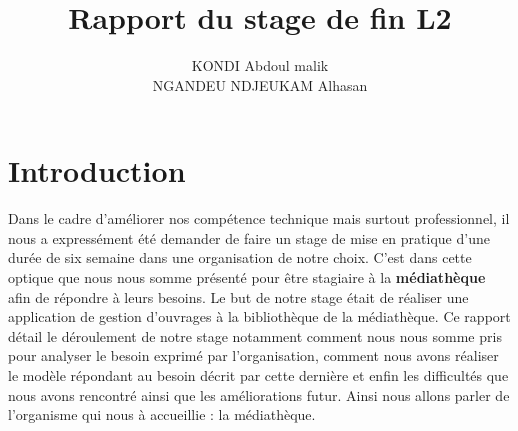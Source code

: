 \documentclass[12pt,a4paper]{article}
\author{KONDI Abdoul malik \\ NGANDEU NDJEUKAM Alhasan}
\title{Rapport du stage de fin L2}
\begin{document}
\maketitle
\tableofcontents
\newpage

\section{Introduction}
Dans le cadre d'améliorer nos compétence technique mais surtout professionnel, il nous a expressément été demander de faire un stage de mise en pratique d'une durée de six semaine dans une organisation de notre choix. C'est dans cette optique que nous nous somme présenté pour être stagiaire à la \textbf{médiathèque} afin de répondre à leurs besoins.
Le but de notre stage était de réaliser une application de gestion d'ouvrages à la  bibliothèque de la médiathèque.
Ce rapport détail le déroulement de notre stage notamment comment nous nous somme pris pour analyser le besoin exprimé par l'organisation, comment nous avons réaliser le modèle répondant au besoin décrit par cette dernière et enfin les difficultés que nous avons rencontré ainsi que les améliorations futur. Ainsi nous allons parler de l'organisme qui nous à accueillie : la médiathèque.
\end{document}
